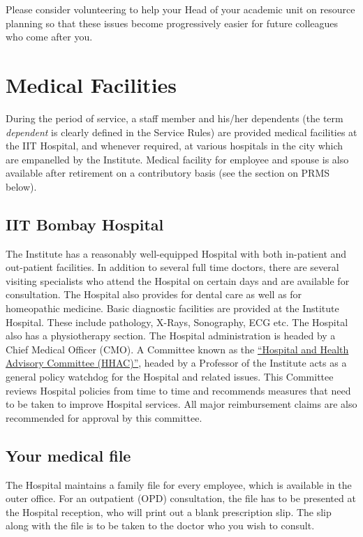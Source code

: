 \documentclass[
  10pt,
  a5paper,
  10pt,
  openany]{amsbook}
\begin{document}
Please consider volunteering to help your Head of your academic unit on
resource planning so that these issues become progressively easier for
future colleagues who come after you.

\chapter{Medical Facilities}\label{medical-facilities}

During the period of service, a staff member and his/her dependents (the
term \emph{dependent} is clearly defined in the Service Rules) are
provided medical facilities at the IIT Hospital, and whenever required,
at various hospitals in the city which are empanelled by the Institute.
Medical facility for employee and spouse is also available after
retirement on a contributory basis (see the section on PRMS below).

\section{IIT Bombay Hospital}\label{iit-bombay-hospital}

The Institute has a reasonably well-equipped Hospital with both
in-patient and out-patient facilities. In addition to several full time
doctors, there are several visiting specialists who attend the Hospital
on certain days and are available for consultation. The Hospital also
provides for dental care as well as for homeopathic medicine. Basic
diagnostic facilities are provided at the Institute Hospital. These
include pathology, X-Rays, Sonography, ECG etc. The Hospital also has a
physiotherapy section. The Hospital administration is headed by a Chief
Medical Officer (CMO). A Committee known as the
\href{https://www.iitb.ac.in/hospital/HHAC.html}{``Hospital and Health
Advisory Committee (HHAC)''}, headed by a Professor of the Institute
acts as a general policy watchdog for the Hospital and related issues.
This Committee reviews Hospital policies from time to time and
recommends measures that need to be taken to improve Hospital services.
All major reimbursement claims are also recommended for approval by this
committee.

\section{Your medical file}\label{your-medical-file}

The Hospital maintains a family file for every employee, which is
available in the outer office. For an outpatient (OPD) consultation, the
file has to be presented at the Hospital reception, who will print out a
blank prescription slip. The slip along with the file is to be taken to
the doctor who you wish to consult.
\end{document}
